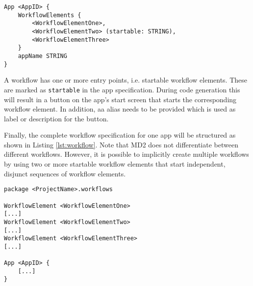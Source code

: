 \begin{lstlisting}[language=MD2, label=lst:app, caption=App Definition in \MD]
App <AppID> {
	WorkflowElements {
		<WorkflowElementOne>,
		<WorkflowElementTwo> (startable: STRING),
		<WorkflowElementThree> 
	}
	appName STRING
}
\end{lstlisting}

A workflow has one or more entry points, i.e. startable workflow elements. These are marked as {\lstinline!startable!} in the app specification. During code generation this will result in a button on the app's start screen that starts the corresponding workflow element. In addition, aa alias needs to be provided which is used as label or description for the button.

Finally, the complete workflow specification for one app will be structured as shown in Listing \ref{lst:workflow}. Note that MD2 does not differentiate between different workflows. However, it is possible to implicitly create multiple workflows by using two or more startable workflow elements that start independent, disjunct sequences of workflow elements.

\begin{lstlisting}[language=MD2, label=lst:workflow, caption=Workflow Definition in \MD]
package <ProjectName>.workflows

WorkflowElement <WorkflowElementOne>
[...]
WorkflowElement <WorkflowElementTwo>
[...]
WorkflowElement <WorkflowElementThree>
[...]

App <AppID> {
	[...]
}
\end{lstlisting}